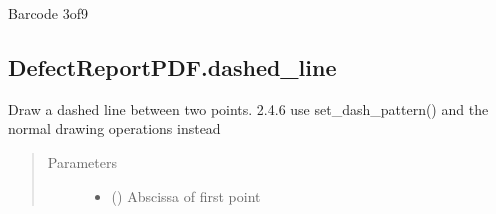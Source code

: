 \documentclass[letterpaper,10pt,english]{sphinxmanual}
\begin{document}
\begin{fulllineitems}
\begin{fulllineitems}
\label{\detokenize{generated/quality_assessment.quality_pdf_report.DefectReportPDF.code39:quality_assessment.quality_pdf_report.DefectReportPDF.code39}}
\sphinxAtStartPar
Barcode 3of9

\end{fulllineitems}



\subsection{DefectReportPDF.dashed\_line}
\label{\detokenize{generated/quality_assessment.quality_pdf_report.DefectReportPDF.dashed_line:defectreportpdf-dashed-line}}\label{\detokenize{generated/quality_assessment.quality_pdf_report.DefectReportPDF.dashed_line::doc}}

\begin{fulllineitems}
\label{\detokenize{generated/quality_assessment.quality_pdf_report.DefectReportPDF.dashed_line:quality_assessment.quality_pdf_report.DefectReportPDF.dashed_line}}
\sphinxAtStartPar
Draw a dashed line between two points.
 2.4.6
\sphinxhyphen{} use set\_dash\_pattern() and the normal drawing operations instead
\begin{quote}\begin{description}
\item[{Parameters}] \leavevmode\begin{itemize}
\item {} 
\sphinxAtStartPar
{} () \textendash{} Abscissa of first point


\end{itemize}
\end{description}
\end{quote}
\end{fulllineitems}
\end{fulllineitems}
\end{document}
